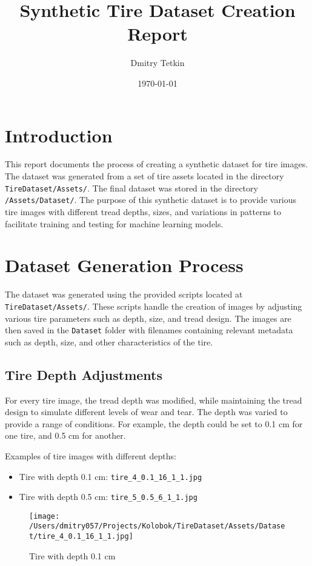 \documentclass{article}
\title{Synthetic Tire Dataset Creation Report}
\author{Dmitry Tetkin}
\date{\today}
\begin{document}
\maketitle

\section{Introduction}
This report documents the process of creating a synthetic dataset for tire images. The dataset was generated from a set of tire assets located in the directory \texttt{TireDataset/Assets/}. The final dataset was stored in the directory \texttt{/Assets/Dataset/}. The purpose of this synthetic dataset is to provide various tire images with different tread depths, sizes, and variations in patterns to facilitate training and testing for machine learning models.

\section{Dataset Generation Process}
The dataset was generated using the provided scripts located at \texttt{TireDataset/Assets/}. These scripts handle the creation of images by adjusting various tire parameters such as depth, size, and tread design. The images are then saved in the \texttt{Dataset} folder with filenames containing relevant metadata such as depth, size, and other characteristics of the tire.

\subsection{Tire Depth Adjustments}
For every tire image, the tread depth was modified, while maintaining the tread design to simulate different levels of wear and tear. The depth was varied to provide a range of conditions. For example, the depth could be set to 0.1 cm for one tire, and 0.5 cm for another. 

Examples of tire images with different depths:
\begin{itemize}
    \item Tire with depth 0.1 cm: \texttt{tire\_4\_0.1\_16\_1\_1.jpg} 
    \item Tire with depth 0.5 cm: \texttt{tire\_5\_0.5\_6\_1\_1.jpg} 
\end{itemize}

\begin{figure}[h!]
\centering
\texttt{[image: /Users/dmitry057/Projects/Kolobok/TireDataset/Assets/Dataset/tire\_4\_0.1\_16\_1\_1.jpg]}
\caption{Tire with depth 0.1 cm}
\end{figure}
\end{document}
